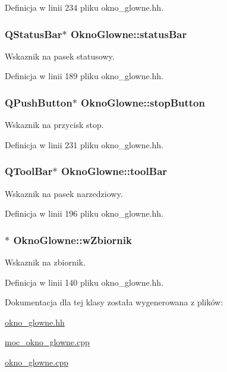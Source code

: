 Definicja w linii 234 pliku okno\+\_\+glowne.\+hh.

\hypertarget{class_okno_glowne_a40a10989bc6b318ac24e2457d7adb53b}{}
\subsubsection[{status\+Bar}]{\setlength{\rightskip}{0pt plus 5cm}Q\+Status\+Bar$\ast$ Okno\+Glowne\+::status\+Bar}\label{class_okno_glowne_a40a10989bc6b318ac24e2457d7adb53b}
Wskaznik na pasek statusowy. 

Definicja w linii 189 pliku okno\+\_\+glowne.\+hh.

\hypertarget{class_okno_glowne_a3051d73dc0e0a27dc30ada43cc6b63c4}{}
\subsubsection[{stop\+Button}]{\setlength{\rightskip}{0pt plus 5cm}Q\+Push\+Button$\ast$ Okno\+Glowne\+::stop\+Button}\label{class_okno_glowne_a3051d73dc0e0a27dc30ada43cc6b63c4}
Wskaznik na przycisk stop. 

Definicja w linii 231 pliku okno\+\_\+glowne.\+hh.

\hypertarget{class_okno_glowne_a6a37dd1f32605092fff7feac712bf429}{}
\subsubsection[{tool\+Bar}]{\setlength{\rightskip}{0pt plus 5cm}Q\+Tool\+Bar$\ast$ Okno\+Glowne\+::tool\+Bar}\label{class_okno_glowne_a6a37dd1f32605092fff7feac712bf429}
Wskaznik na pasek narzedziowy. 

Definicja w linii 196 pliku okno\+\_\+glowne.\+hh.

\hypertarget{class_okno_glowne_af2d1275209898ebdd5ab9de8ef78dffd}{}
\subsubsection[{w\+Zbiornik}]{$\ast$ Okno\+Glowne\+::w\+Zbiornik}\label{class_okno_glowne_af2d1275209898ebdd5ab9de8ef78dffd}
Wskaznik na zbiornik. 

Definicja w linii 140 pliku okno\+\_\+glowne.\+hh.



Dokumentacja dla tej klasy została wygenerowana z plików\+:\begin{DoxyCompactItemize}
\item 
\hyperlink{okno__glowne_8hh}{okno\+\_\+glowne.\+hh}\item 
\hyperlink{moc__okno__glowne_8cpp}{moc\+\_\+okno\+\_\+glowne.\+cpp}\item 
\hyperlink{okno__glowne_8cpp}{okno\+\_\+glowne.\+cpp}\end{DoxyCompactItemize}
